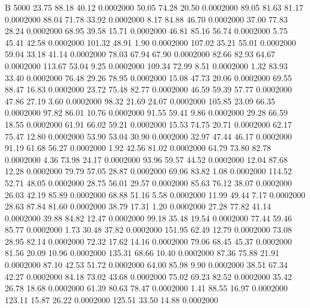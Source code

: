 


B 5000
  23.75   88.18   40.12   0.0002000
  50.05   74.28   20.50   0.0002000
  89.05   81.63   81.17   0.0002000
  88.04   71.78   33.92   0.0002000
   8.17   84.88   46.70   0.0002000
  37.00   77.83   28.24   0.0002000
  68.95   39.58   15.71   0.0002000
  46.81   85.16   56.74   0.0002000
   5.75   45.41   42.58   0.0002000
 101.32   48.91    1.90   0.0002000
 107.02   35.21   55.01   0.0002000
  59.04   33.18   41.14   0.0002000
  78.03   67.94   67.90   0.0002000
  82.66   82.93   64.67   0.0002000
 113.67   53.04    9.25   0.0002000
 109.34   72.99    8.51   0.0002000
   1.32   83.93   33.40   0.0002000
  76.48   29.26   78.95   0.0002000
  15.08   47.73   20.06   0.0002000
  69.55   88.47   16.83   0.0002000
  23.72   75.48   82.77   0.0002000
  46.59   59.39   57.77   0.0002000
  47.86   27.19    3.60   0.0002000
  98.32   21.69   24.07   0.0002000
 105.85   23.09   66.35   0.0002000
  97.82   86.01   10.76   0.0002000
  91.55   59.41    9.86   0.0002000
  29.28   66.59   18.55   0.0002000
  61.91   66.02   59.21   0.0002000
  15.53   74.75   20.71   0.0002000
  62.17   75.47   12.80   0.0002000
  53.90   53.04   30.90   0.0002000
  32.97   47.44   46.17   0.0002000
  91.19   61.68   56.27   0.0002000
   1.92   42.56   81.02   0.0002000
  64.79   73.80   82.78   0.0002000
   4.36   73.98   24.17   0.0002000
  93.96   59.57   44.52   0.0002000
  12.04   87.68   12.28   0.0002000
  79.79   57.05   28.87   0.0002000
  69.06   83.82    1.08   0.0002000
 114.52   52.71   48.05   0.0002000
  28.75   56.01   29.57   0.0002000
  85.63   76.12   38.07   0.0002000
  26.03   42.19   85.89   0.0002000
  68.88   51.16    5.58   0.0002000
  11.99   49.44    7.17   0.0002000
  28.63   87.84   81.60   0.0002000
  38.79   17.31    1.20   0.0002000
  27.28   77.82   41.14   0.0002000
  39.88   84.82   12.47   0.0002000
  99.18   35.48   19.54   0.0002000
  77.44   59.46   85.77   0.0002000
   1.73   30.48   37.82   0.0002000
 151.95   62.49   12.79   0.0002000
  73.08   28.95   82.14   0.0002000
  72.32   17.62   14.16   0.0002000
  79.06   68.45   45.37   0.0002000
  81.56   20.09   10.96   0.0002000
 135.31   68.66   10.40   0.0002000
  87.36   75.88   21.91   0.0002000
  87.10   42.53   51.72   0.0002000
  64.00   85.98    9.90   0.0002000
  38.51   67.34   42.27   0.0002000
  84.18   73.02   43.68   0.0002000
  75.02   69.23   82.52   0.0002000
  35.42   26.78   18.68   0.0002000
  61.39   80.63   78.47   0.0002000
   1.41   88.55   16.97   0.0002000
 123.11   15.87   26.22   0.0002000
 125.51   33.50   14.88   0.0002000
